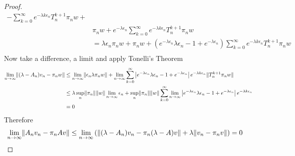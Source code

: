 \begin{proof}
\begin{align*}
- \sum_{k=0}^\infty e^{-\lambda k \epsilon_n} T_n^{k+1} \pi_n w +  \\
&\pi_n w  +
e^{-\lambda \epsilon_n}  \sum_{k=0}^\infty e^{-\lambda k \epsilon_n} T_n^{k+1} \pi_n w \\
&= \lambda \epsilon_n \pi_n w 
+ \pi_n w  + 
(e^{-\lambda \epsilon_n} \lambda \epsilon_n -1 + e^{-\lambda \epsilon_n} ) \sum_{k=0}^\infty e^{-\lambda k \epsilon_n} T_n^{k+1} \pi_n w \\
\end{align*}
Now take a difference, a limit and apply Tonelli's Theorem 
\begin{align*}
\lim_{n \to \infty} \lVert (\lambda - A_n) v_n - \pi_n w \rVert &\leq 
\lim_{n \to \infty} \lVert \epsilon_n \lambda \pi_n w \rVert + \lim_{n \to \infty} \sum_{k=0}^\infty \left \vert e^{-\lambda \epsilon_n} \lambda \epsilon_n -1 + e^{-\lambda \epsilon_n}  \right \vert
e^{-\lambda k \epsilon_n} \lVert T_n^{k+1} \pi_n w \rVert \\
&\leq \lambda \sup_n \lVert \pi_n \rVert \lVert w \rVert \lim_{n \to \infty} \epsilon_n + \sup_n \lVert \pi_n \rVert \lVert w \rVert \sum_{k=0}^\infty \lim_{n \to \infty} \left \vert e^{-\lambda \epsilon_n} \lambda \epsilon_n -1 + e^{-\lambda \epsilon_n}  \right \vert
e^{-\lambda k \epsilon_n}  \\
&= 0
\end{align*}
Therefore 
\begin{align*}
\lim_{n \to \infty} \lVert A_n v_n - \pi_n A v \rVert &\leq \lim_{n \to \infty} \left( \lVert (\lambda - A_n) v_n - \pi_n (\lambda - A) v \rVert + \lambda \lVert v_n - \pi_n v \rVert \right) = 0
\end{align*}


\end{proof}
